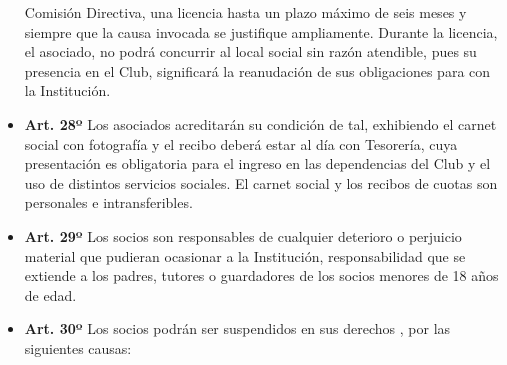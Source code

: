 \documentclass[]{book}
\begin{document}
\begin{itemize}
  Comisión Directiva, una licencia hasta un plazo máximo de seis meses y
  siempre que la causa invocada se justifique ampliamente. Durante la
  licencia, el asociado, no podrá concurrir al local social sin razón
  atendible, pues su presencia en el Club, significará la reanudación de
  sus obligaciones para con la Institución.
\item
  \textbf{Art. 28º} Los asociados acreditarán su condición de tal,
  exhibiendo el carnet social con fotografía y el recibo deberá estar al
  día con Tesorería, cuya presentación es obligatoria para el ingreso en
  las dependencias del Club y el uso de distintos servicios sociales. El
  carnet social y los recibos de cuotas son personales e
  intransferibles.
\item
  \textbf{Art. 29º} Los socios son responsables de cualquier deterioro o
  perjuicio material que pudieran ocasionar a la Institución,
  responsabilidad que se extiende a los padres, tutores o guardadores de
  los socios menores de 18 años de edad.
\item
  \textbf{Art. 30º} Los socios podrán ser suspendidos en sus derechos ,
  por las siguientes causas:


\end{itemize}
\end{document}
